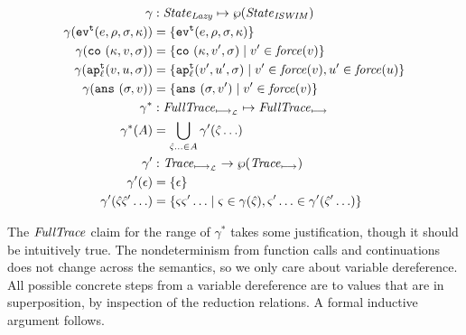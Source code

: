 \documentclass{llncs}
\begin{document}
{\begin{align*}
\gamma &: \State_{\mathit{Lazy}} \mapsto \wp(\State_{\mathit{ISWIM}}) \\
\gamma(\ev[^\mcntr]{\mexp, \menv, \msto, \mkont}) &= \setof{\ev[^\mcntr]{\mexp, \menv, \msto, \mkont}} \\
\gamma(\co{\mkont, \mval, \msto}) &= \setof{\co{\mkont, \mval', \msto} \mid \mval' \in \force(\mval)} \\
\gamma(\ap[_\mlab^\mcntr]{\mval, \mvalx{u}, \msto}) &= 
   \setof{\ap[_\mlab^\mcntr]{\mval', \mvalx{u}', \msto}
          \mid
          \mval' \in \force(\mval),
          \mvalx{u}' \in \force(\mvalx{u})} \\
\gamma(\ans{\msto, \mval}) &= \setof{\ans{\msto, \mval'} \mid \mval' \in \force(\mval)} \\
\gamma^* &: \FullTrace_{\lmachstep} \mapsto \FullTrace_{\machstep} \\
\gamma^*(A) &= \bigcup\limits_{\mastate\ldots \in A}{\gamma'(\mastate\ldots)} \\
\gamma' &: \Trace_{\lmachstep} \to \wp(\Trace_{\machstep}) \\
\gamma'(\epsilon) &= \setof{\epsilon} \\
\gamma'(\mastate\mastate'\ldots) &=
  \setof{\mstate\mstate'\ldots \mid 
          \mstate \in \gamma(\mastate),
          \mstate'\ldots \in \gamma'(\mastate'\ldots)}
\end{align*}

The $\FullTrace$ claim for the range of $\gamma^*$ takes some
justification, though it should be intuitively true. The
nondeterminism from function calls and continuations does not change
across the semantics, so we only care about variable dereference. All
possible concrete steps from a variable dereference are to values that
are in superposition, by inspection of the reduction relations. A formal inductive argument follows.

}
\end{document}
